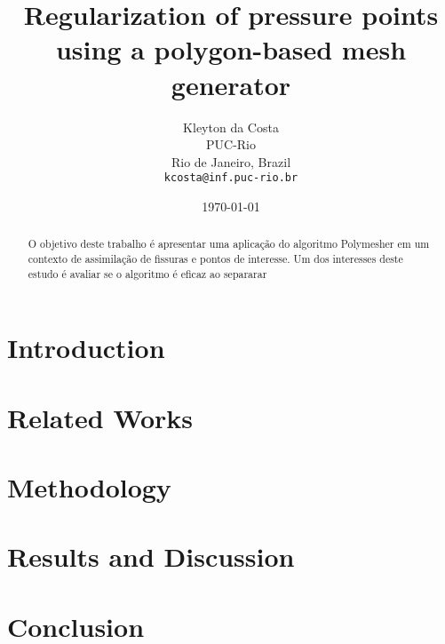 \documentclass{article}
\title{Regularization of pressure points using a polygon-based mesh generator}
\date{\today}
\author{
  Kleyton da Costa \\
  PUC-Rio \\
  Rio de Janeiro, Brazil\\
  \texttt{kcosta@inf.puc-rio.br} \\
}
\begin{document}
\maketitle
	
\begin{abstract}
  O objetivo deste trabalho é apresentar uma aplicação do algoritmo Polymesher em um contexto de assimilação de fissuras e pontos de interesse. Um dos interesses deste estudo é avaliar se o algoritmo é eficaz ao separarar 
\end{abstract}
	
	
\section{Introduction}



\section{Related Works}



\section{Methodology}


\section{Results and Discussion}



\section{Conclusion}


\end{document}
